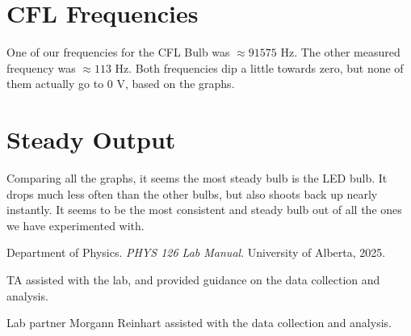 \documentclass[12pt]{article}
\begin{document}
\section{CFL Frequencies}

One of our frequencies for the CFL Bulb was $\approx 91575$ Hz. The other measured frequency was $\approx 113$ Hz. Both frequencies
dip a little towards zero, but none of them actually go to 0 V, based on the graphs.

\section{Steady Output}

Comparing all the graphs, it seems the most steady bulb is the LED bulb. It drops much less often than the other bulbs, but also
shoots back up nearly instantly. It seems to be the most consistent and steady bulb out of all the ones we have experimented with.

\begin{thebibliography}{9}
    Department of Physics. \textit{PHYS 126 Lab Manual}. University of Alberta, 2025.

    TA assisted with the lab, and provided guidance on the data collection and analysis.

    Lab partner Morgann Reinhart assisted with the data collection and analysis.
    
\end{thebibliography}
\end{document}
